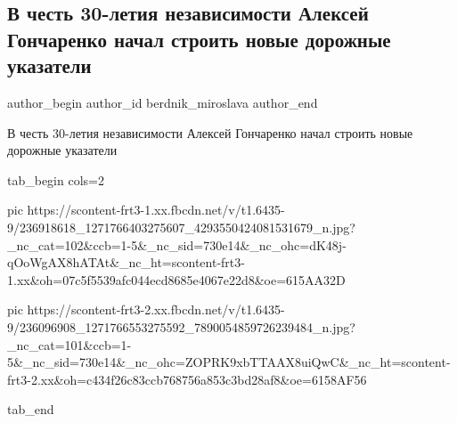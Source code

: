  
 
 
 
 
 
\subsection{В честь 30-летия независимости Алексей Гончаренко начал строить новые дорожные указатели}
\label{sec:22_08_2021.fb.berdnik_miroslava.1.goncharenko_ukazateli_nezalezhnist}
 
\ifcmt
 author_begin
   author_id berdnik_miroslava
 author_end
\fi

В честь 30-летия независимости Алексей Гончаренко начал строить новые дорожные
указатели


\ifcmt
  tab_begin cols=2

     pic https://scontent-frt3-1.xx.fbcdn.net/v/t1.6435-9/236918618_1271766403275607_4293550424081531679_n.jpg?_nc_cat=102&ccb=1-5&_nc_sid=730e14&_nc_ohc=dK48j-qOoWgAX8hATAt&_nc_ht=scontent-frt3-1.xx&oh=07c5f5539afc044ecd8685e4067e22d8&oe=615AA32D

     pic https://scontent-frt3-2.xx.fbcdn.net/v/t1.6435-9/236096908_1271766553275592_7890054859726239484_n.jpg?_nc_cat=101&ccb=1-5&_nc_sid=730e14&_nc_ohc=ZOPRK9xbTTAAX8uiQwC&_nc_ht=scontent-frt3-2.xx&oh=c434f26c83ccb768756a853c3bd28af8&oe=6158AF56

  tab_end
\fi

